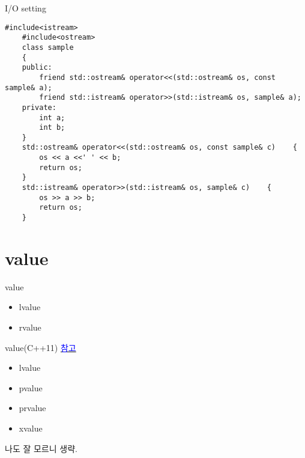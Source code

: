 \documentclass[10pt]{beamer}
\begin{document}





\begin{frame}[fragile]{I/O setting}
    \begin{lstlisting}[style = CppStyle]
    #include<istream>
    #include<ostream>
    class sample
    {
    public:
        friend std::ostream& operator<<(std::ostream& os, const sample& a);
        friend std::istream& operator>>(std::istream& os, sample& a);
    private:
        int a;
        int b; 
    }
    std::ostream& operator<<(std::ostream& os, const sample& c)    {
        os << a <<' ' << b;
        return os;
    }
    std::istream& operator>>(std::istream& os, sample& c)    {
        os >> a >> b;
        return os;
    }
    \end{lstlisting}
\end{frame}    

\section{value}

\begin{frame}{value}
    \begin{itemize}
        \item lvalue
        \item rvalue
    \end{itemize}
\end{frame}



\begin{frame}{value(C++11)}
    \href{https://en.cppreference.com/w/cpp/language/value_category}{\textcolor{blue}{참고}}
    
    \begin{itemize}
        \item lvalue
        \item pvalue
        \item prvalue
        \item xvalue
    \end{itemize}

    나도 잘 모르니 생략.
\end{frame}
\end{document}
